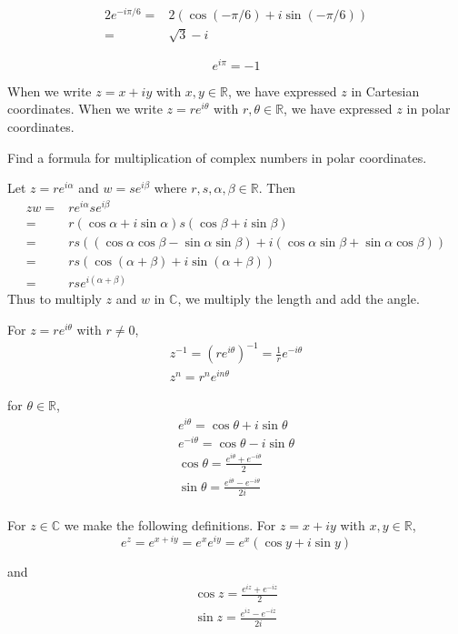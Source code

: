\begin{exmp}
\begin{align*}
    2e^{-i\pi/6} = & 2(\cos (-\pi/6) + i \sin (-\pi/6))\\
    =& \sqrt{3} - i
\end{align*}
\end{exmp}

\begin{exmp}
\[e^{i\pi} = -1\]
\end{exmp}

When we write $z = x + iy$ with $x,y\in\mathbb{R}$, we have expressed $z$ in Cartesian coordinates. When we write $z = re^{i\theta}$ with $r,\theta \in\mathbb{R}$, we have expressed $z$ in polar coordinates.

\begin{exmp}
Find a formula for multiplication of complex numbers in polar coordinates.
\end{exmp}
\begin{solution}
Let $z = re^{i\alpha}$ and $w = se^{i\beta}$ where $r,s,\alpha,\beta \in\mathbb{R}$. Then
\begin{align*}
zw =& re^{i\alpha}se^{i\beta}\\
= & r(\cos \alpha + i\sin\alpha)s(\cos\beta + i \sin \beta)\\
= & rs((\cos\alpha \cos\beta - \sin\alpha \sin\beta) + i(\cos\alpha\sin\beta + \sin\alpha\cos\beta))\\
= & rs(\cos(\alpha+\beta) + i\sin(\alpha+\beta))\\
= & rs e^{i(\alpha+\beta)}
\end{align*}
Thus to multiply $z$ and $w$ in $\mathbb{C}$, we multiply the length and add the angle.
\end{solution}

\begin{exmp}
For $z = re^{i\theta}$ with $r\neq 0$, 
\begin{gather*}
    z^{-1} = (re^{i\theta})^{-1} = \frac{1}{r}e^{-i\theta}\\
    z^{n} = r^{n}e^{in\theta}
\end{gather*}
\end{exmp}

\begin{defn}
for $\theta \in \mathbb{R}$,
\begin{gather*}
    e^{i\theta} = \cos \theta + i\sin\theta \\
    e^{-i\theta} = \cos \theta - i\sin\theta\\
    \cos\theta = \frac{e^{i\theta}+e^{-i\theta}}{2}\\
    \sin\theta = \frac{e^{i\theta}-e^{-i\theta}}{2i}\\
\end{gather*}
\end{defn}

\begin{defn}
For $z\in\mathbb{C}$ we make the following definitions. For $z = x + iy$ with $x,y\in\mathbb{R}$, \[e^z = e^{x + iy} = e^xe^{iy} = e^x(\cos y + i\sin y)\]

and \begin{gather*}
    \cos z = \frac{e^{iz}+e^{-iz}}{2}\\
    \sin z = \frac{e^{iz}-e^{-iz}}{2i}\\
\end{gather*}
\end{defn}